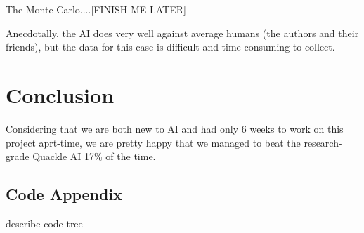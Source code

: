 \documentclass[12pt]{article}
\begin{document}
The Monte Carlo....[FINISH ME LATER]

Anecdotally, the AI does very well against average humans (the authors and their friends), but the data for this case is difficult and time consuming to collect.

\section*{Conclusion}
Considering that we are both new to AI and had only 6 weeks to work on this project aprt-time, we are pretty happy that we managed to beat the research-grade Quackle AI 17\% of the time.

\clearpage
\begin{center}
 \section*{Code Appendix}
\end{center}
describe code tree
\end{document}
